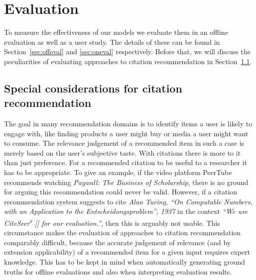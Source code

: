\chapter{Evaluation}\label{chap:evaluation}
To measure the effectiveness of our models we evaluate them in an offline evaluation as well as a user study. The details of these can be found in Section~\ref{sec:offeval} and \ref{sec:oneval} respectively. Before that, we will discuss the peculiarities of evaluating approaches to citation recommendation in Section~\ref{sec:citrecspecial}.

\section{Special considerations for citation recommendation}\label{sec:citrecspecial}
The goal in many recommendation domains is to identify items a user is likely to engage with, like finding products a user might buy or media a user might want to consume. The relevance judgement of a recommended item in such a case is merely based on the user's subjective taste.
With citations there is more to it than just preference. For a recommended citation to be useful to a researcher it has to be appropriate. To give an example, if the video platform PeerTube recommends watching \emph{Paywall: The Business of Scholarship}, there is no ground for arguing this recommendation could never be valid. However, if a citation recommendation system suggests to cite \emph{Alan Turing, ``On Computable Numbers, with an Application to the Entscheidungsproblem'', 1937} in the context \emph{``We use CiteSeer\textsuperscript{x} [] for our evaluation.''}, then this is arguably not usable. This circumstance makes the evaluation of approaches to citation recommendation comparably difficult, because the accurate judgement of relevance (and by extension applicability) of a recommended item for a given input requires expert knowledge. This has to be kept in mind when automatically generating ground truths for offline evaluations and also when interpreting evaluation results.


